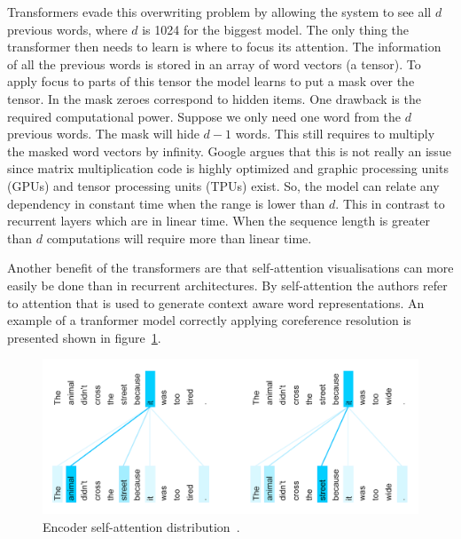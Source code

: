 Transformers evade this overwriting problem by allowing the system to see all $d$ previous words, where $d$ is 1024 for the biggest model.
The only thing the transformer then needs to learn is where to focus its attention.
The information of all the previous words is stored in an array of word vectors (a tensor).
To apply focus to parts of this tensor the model learns to put a mask over the tensor.
In the mask zeroes correspond to hidden items.
One drawback is the required computational power.
Suppose we only need one word from the $d$ previous words.
The mask will hide $d-1$ words.
This still requires to multiply the masked word vectors by infinity.
Google argues that this is not really an issue since matrix multiplication code is highly optimized and graphic processing units (GPUs) and tensor processing units (TPUs) exist.
So, the model can relate any dependency in constant time when the range is lower than $d$.
This in contrast to recurrent layers which are in linear time.
When the sequence length is greater than $d$ computations will require more than linear time.

Another benefit of the transformers are that self-attention visualisations can more easily be done than in recurrent architectures.
By self-attention the authors refer to attention that is used to generate context aware word representations.
An example of a tranformer model correctly applying coreference resolution is presented shown in figure~\ref{fig:coreference_resolution}.

\begin{figure}[htbp]
    \begin{center}
        \includegraphics[width=\textwidth]{figures/coreference_resolution.png}
    \end{center}
    \caption{Encoder self-attention distribution~\citep{uszkoreit2017}.}
    \label{fig:coreference_resolution}
\end{figure}


